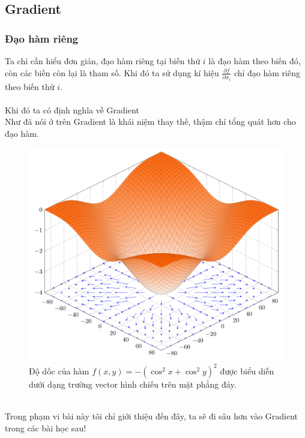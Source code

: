 \documentclass{article}
\begin{document}
\subsection{Gradient}
\subsubsection*{Đạo hàm riêng}
Ta chỉ cần hiểu đơn giản, đạo hàm riêng tại biến thứ $i$ là đạo hàm theo biến đó, còn các biến còn lại là tham số. Khi đó ta sử dụng kí hiệu $\frac{\partial f}{\partial x_i}$ chỉ đạo hàm riêng theo biến thứ $i$.
\\\\ Khi đó ta có định nghĩa về Gradient\\
Như đã nói ở trên Gradient là khái niệm thay thế, thậm chí tổng quát hơn cho đạo hàm. 
\begin{figure}[ht!]
    \centering
    \includegraphics[width = 0.7 \linewidth]{1911.png}
    \caption{Độ dốc của hàm $f(x,y) = -(\cos^{2}{x}+\cos^{2}{y})^{2}$ được biểu diễn dưới dạng trường vector hình chiếu trên mặt phẳng đáy.}
    \label{fig1}
\end{figure}
\phantom{a}\\
Trong phạm vi bài này tôi chỉ giới thiệu đến đây, ta sẽ đi sâu hơn vào Gradient trong các bài học sau!
\end{document}
